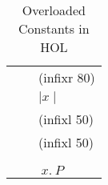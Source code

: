 \begin{isabellebody}
\begin{isamarkuptext}
\begin{table}[htbp]
\begin{center}
\begin{tabular}{lll}
\isa{{\isacharcircum}} & \isa{{\isacharparenleft}{\isacharprime}a{\isacharcolon}{\isacharcolon}power{\isacharparenright}\ {\isasymRightarrow}\ nat\ {\isasymRightarrow}\ {\isacharprime}a} & (infixr 80) \\
\isa{abs} &  \isa{{\isacharparenleft}{\isacharprime}a{\isacharcolon}{\isacharcolon}minus{\isacharparenright}\ {\isasymRightarrow}\ {\isacharprime}a} & ${\mid} x {\mid}$\\
\isa{{\isasymle}} & \isa{{\isacharparenleft}{\isacharprime}a{\isacharcolon}{\isacharcolon}ord{\isacharparenright}\ {\isasymRightarrow}\ {\isacharprime}a\ {\isasymRightarrow}\ bool} & (infixl 50) \\
\isa{{\isacharless}} & \isa{{\isacharparenleft}{\isacharprime}a{\isacharcolon}{\isacharcolon}ord{\isacharparenright}\ {\isasymRightarrow}\ {\isacharprime}a\ {\isasymRightarrow}\ bool} & (infixl 50) \\
\isa{min} &  \isa{{\isacharparenleft}{\isacharprime}a{\isacharcolon}{\isacharcolon}ord{\isacharparenright}\ {\isasymRightarrow}\ {\isacharprime}a\ {\isasymRightarrow}\ {\isacharprime}a} \\
\isa{max} &  \isa{{\isacharparenleft}{\isacharprime}a{\isacharcolon}{\isacharcolon}ord{\isacharparenright}\ {\isasymRightarrow}\ {\isacharprime}a\ {\isasymRightarrow}\ {\isacharprime}a} \\
\isa{Least} & \isa{{\isacharparenleft}{\isacharprime}a{\isacharcolon}{\isacharcolon}ord\ {\isasymRightarrow}\ bool{\isacharparenright}\ {\isasymRightarrow}\ {\isacharprime}a} &
\isa{LEAST}$~x.~P$
\end{tabular}
\caption{Overloaded Constants in HOL}
\label{tab:overloading}
\end{center}
\end{table}%
\end{isamarkuptext}%
\isamarkuptrue%
\isamarkupfalse%
\end{isabellebody}%
